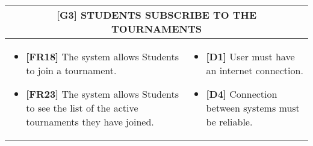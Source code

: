 \documentclass{article}
\begin{document}
\begin{table}[H]
\begin{adjustwidth}{-1in}{-1in}
 \renewcommand{\arraystretch}{1.5}
    \begin{tabular}{|p{9.5cm}|p{9.5cm}|}
        \hline
        \multicolumn{2}{|c|}{\textbf{[G3] STUDENTS SUBSCRIBE TO THE TOURNAMENTS}} \\
        \hline
        \begin{itemize}[label={}, left=0pt, align=left, itemsep=5pt]
            \item \textbf{[FR18]} The system allows Students to join a tournament.
            \item \textbf{[FR23]} The system allows Students to see the list of the active tournaments they have joined.
        \end{itemize} &
        \begin{itemize}[label={}, left=0pt, align=left, itemsep=5pt]
            \item \textbf{[D1]} User must have an internet connection.
            \item \textbf{[D4]} Connection between systems must be reliable.
        \end{itemize} \\
        \hline
    \end{tabular}
\end{adjustwidth}
\end{table}
\end{document}
